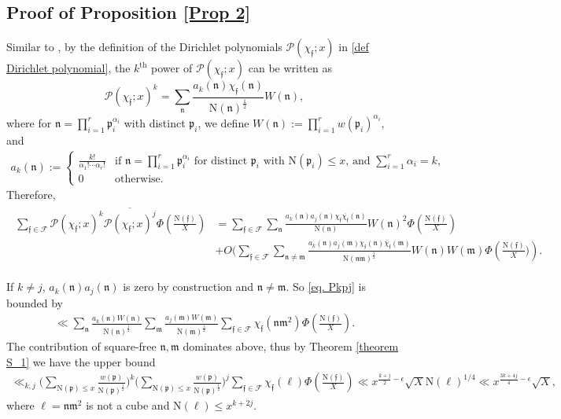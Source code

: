 \documentclass[11pt]{amsart}
\def\p{\mathfrak{p}}
\def\n{\mathfrak{n}}
\def\m{\mathfrak{m}}
\newcommand{\norm}{\mathrm{N}}
\numberwithin{equation}{section}
\theoremstyle{remark}
\begin{document}
\subsection{Proof of Proposition \ref{Prop 2}}\label{pf-prop 2}

Similar to \cite[Proof of Lemma 5.2]{HW}, by the definition of the Dirichlet polynomials $\mathcal{P}(\chi_\mathfrak{f}; x)$ in \eqref{def Dirichlet polynomial}, the $k^\mathrm{th}$ power of $\mathcal{P}(\chi_\mathfrak{f}; x)$ can be written as
$$\mathcal{P}(\chi_\mathfrak{f}; x)^k
= \sum_{\n} \frac{ a_{k}(\n)\chi_\mathfrak{f}(\n)}{\norm(\n)^{\frac{1}{2}}} W(\n),
$$
where for $\n=\prod_{i=1}^{r} \p_{i}^{\alpha_{i}}$ with distinct $\p_i$, we define
$
W(\n) := \prod_{i=1}^{r} w(\p_{i})^{\alpha_{i}},
$
and
\begin{align*}
a_{k}(\n):=
\left\{
\begin{array}{lllll}\frac{k!}{\alpha_{1}!\cdots\alpha_{r}!}&\mbox{if $\n=\prod_{i=1}^{r} \p_{i}^{\alpha_{i}}$ for distinct $\p_i$ with $\norm(\p_{i})\leq x$, and $\sum_{i=1}^{r}\alpha_{i}=k$,}\\
0 &\mbox{otherwise}.
\end{array}\right.
\end{align*}
Therefore, 
\begin{align}\label{eq. Pkpj}
\begin{split}
    \sum_{\mathfrak{f}\in\mathcal{F}}  \mathcal{P}(\chi_\mathfrak{f}; x)^{k}\overline{\mathcal{P}(\chi_\mathfrak{f}; x)^{j}} \Phi\left(\frac{\norm(\mathfrak{f})}{X}\right)
&=\sum_{\mathfrak{f}\in\mathcal{F}}  \sum_{\n} \frac{ a_{k}(\n)a_{j}(\n)\chi_\mathfrak{f}\overline{\chi_\mathfrak{f}}(\n)}{\norm(\n)} W(\n)^2\Phi\left(\frac{\norm(\mathfrak{f})}{X}\right)\\
&+
O\bigg( 
\sum_{\mathfrak{f}\in\mathcal{F}}  \sum_{\n\neq\m} \frac{ a_{k}(\n)a_{j}(\m)\chi_\mathfrak{f}(\n)\overline{\chi_\mathfrak{f}}(\m)}{\norm(\n\m)^{\frac{1}{2}}} W(\n)W(\m)\Phi\left(\frac{\norm(\mathfrak{f})}{X}\bigg)
\right).
\end{split}
\end{align}

If $k\neq j$, $a_{k}(\n)a_{j}(\n)$ is zero by construction and $\n\ne\m$. So \eqref{eq. Pkpj} is bounded by
\begin{align*}
    \ll
    \sum_{\n}\frac{a_k(\n)W(\n)}{\norm(\n)^{\frac{1}{2}}}
    \sum_{\m} \frac{a_j(\m)W(\m)}{\norm(\m)^{\frac{1}{2}}}
    \sum_{\mathfrak{f} \in \mathcal{F}}\chi_\mathfrak{f}(\n\m^2) \Phi\left(\frac{\norm(\mathfrak{f})}{X}\right).
\end{align*}
The contribution of square-free $\n, \m$ dominates above, thus by Theorem \ref{theorem S_1} we have the upper bound
\begin{align*}
  \ll_{k, j}  \bigg(\sum_{\norm(\p)\le x}\frac{w(\p)}{\norm(\p)^{\frac{1}{2}}}\bigg)^k
    \bigg(\sum_{\norm(\p)\le x} \frac{w(\p)}{\norm(\p)^{\frac{1}{2}}}\bigg)^j
    \sum_{\mathfrak{f} \in \mathcal{F}}\chi_\mathfrak{f}(\ell) \Phi\left(\frac{\norm(\mathfrak{f})}{X}\right)
    \ll 
    x^{\frac{k+j}{2}-\epsilon} \sqrt{X}\norm(\ell)^{1/4}
    \ll
    x^{\frac{3k+4j}{4}-\epsilon}\sqrt{X},
\end{align*}
where $\ell=\n\m^2
$ is not a cube and $\norm(\ell)\le x^{k+2j}$.
\end{document}
